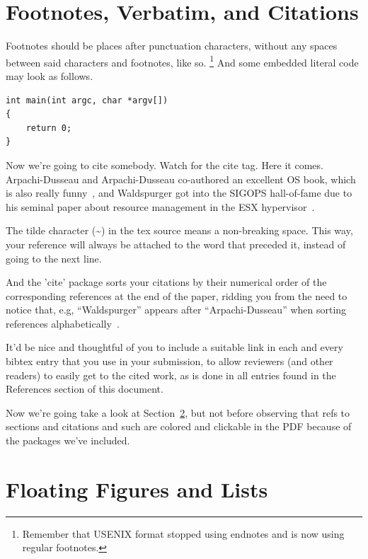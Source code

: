 \documentclass[letterpaper,twocolumn,10pt]{article}
\begin{document}
\section{Footnotes, Verbatim, and Citations}

Footnotes should be places after punctuation characters, without any
spaces between said characters and footnotes, like so.%
\footnote{Remember that USENIX format stopped using endnotes and is
  now using regular footnotes.} And some embedded literal code may
look as follows.

\begin{verbatim}
int main(int argc, char *argv[]) 
{
    return 0;
}
\end{verbatim}

Now we're going to cite somebody. Watch for the cite tag. Here it
comes. Arpachi-Dusseau and Arpachi-Dusseau co-authored an excellent OS
book, which is also really funny~\cite{arpachiDusseau18:osbook}, and
Waldspurger got into the SIGOPS hall-of-fame due to his seminal paper
about resource management in the ESX hypervisor~\cite{waldspurger02}.

The tilde character (\~{}) in the tex source means a non-breaking
space. This way, your reference will always be attached to the word
that preceded it, instead of going to the next line.

And the 'cite' package sorts your citations by their numerical order
of the corresponding references at the end of the paper, ridding you
from the need to notice that, e.g, ``Waldspurger'' appears after
``Arpachi-Dusseau'' when sorting references
alphabetically~\cite{waldspurger02,arpachiDusseau18:osbook}. 

It'd be nice and thoughtful of you to include a suitable link in each
and every bibtex entry that you use in your submission, to allow
reviewers (and other readers) to easily get to the cited work, as is
done in all entries found in the References section of this document.

Now we're going take a look at Section~\ref{sec:figs}, but not before
observing that refs to sections and citations and such are colored and
clickable in the PDF because of the packages we've included.

\section{Floating Figures and Lists}
\label{sec:figs}
\end{document}

